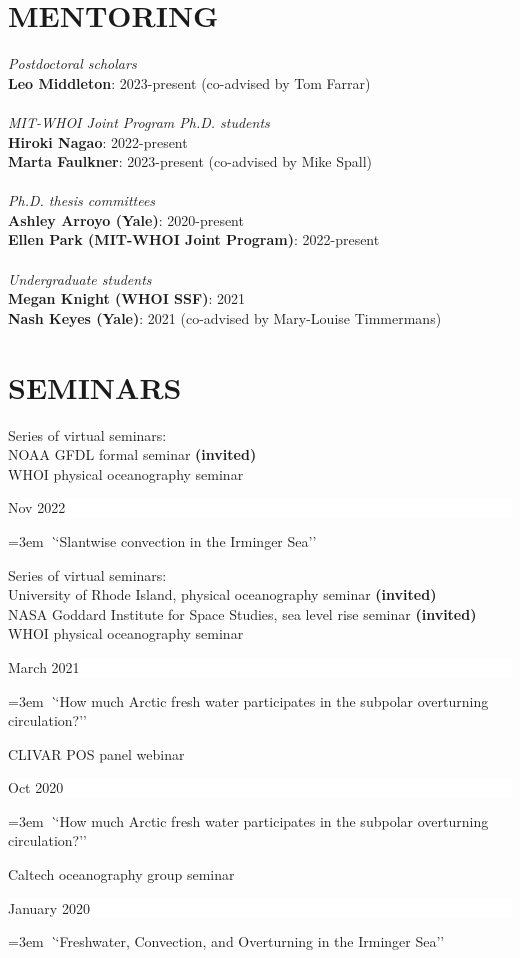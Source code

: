 \documentclass[paper=letter,fontsize=11pt]{scrartcl} %
\newcommand{\sepspace}{\vspace*{3mm}}		%
\newcommand{\NewPart}[2]{\section*{\uppercase{#1} #2}}
\newcommand{\ShortEntry}[2]{\normalsize \noindent \textbf{#1}: #2 \\ }
\newcommand{\TalkEntry}[3]{
		\noindent #1 \hfill      %
		\colorbox{White}{%
			\parbox{6em}{%
			\hfill\color{Black}#2}} \par  %
		\noindent\hangindent=3em\hangafter=0 \textit ``#3''\sepspace} %
\begin{document}


\NewPart{Mentoring}{}

\emph{Postdoctoral scholars}\\
\ShortEntry{Leo Middleton}{2023-present (co-advised by Tom Farrar)}\\
\emph{MIT-WHOI Joint Program Ph.D. students}\\
\ShortEntry{Hiroki Nagao}{2022-present}
\ShortEntry{Marta Faulkner}{2023-present (co-advised by Mike Spall)}\\
\emph{Ph.D. thesis committees}\\
\ShortEntry{Ashley Arroyo (Yale)}{2020-present}
\ShortEntry{Ellen Park (MIT-WHOI Joint Program)}{2022-present}\\
\emph{Undergraduate students}\\
\ShortEntry{Megan Knight (WHOI SSF)}{2021}
\ShortEntry{Nash Keyes (Yale)}{2021  (co-advised by Mary-Louise Timmermans)}


\NewPart{Seminars}{}

\TalkEntry{Series of virtual seminars:\\NOAA GFDL formal seminar \textbf{(invited)}\\WHOI physical oceanography seminar}{Nov 2022}{Slantwise convection in the Irminger Sea}

\TalkEntry{Series of virtual seminars:\\University of Rhode Island, physical oceanography seminar \textbf{(invited)} \\NASA Goddard Institute for Space Studies, sea level rise seminar \textbf{(invited)} \\WHOI physical oceanography seminar}{March 2021}{How much Arctic fresh water participates in the subpolar overturning circulation?}

\TalkEntry{CLIVAR POS panel webinar}{Oct 2020}{How much Arctic fresh water participates in the subpolar overturning circulation?}

\TalkEntry{Caltech oceanography group seminar}{January 2020}{Freshwater, Convection, and Overturning in the Irminger Sea}
\end{document}
